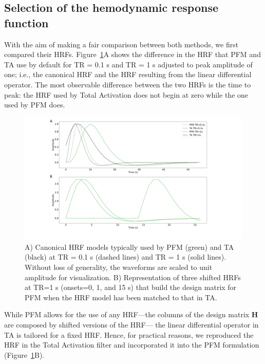 \subsection{Selection of the hemodynamic response function}

With the aim of making a fair comparison between both methods, we first compared their HRFs. Figure~\ref{fig:hrf_diff}A shows the difference in the HRF that PFM and TA use by default for TR = 0.1 s and TR = 1 s adjusted to peak amplitude of one; i.e., the canonical HRF and the HRF resulting from the linear differential operator. The most observable difference between the two HRFs is the time to peak: the HRF used by Total Activation does not begin at zero while the one used by PFM does.

\begin{figure}[h]
    \includegraphics[width=\columnwidth]{figures/pfm_ta_hrf.pdf}
    \caption{A) Canonical HRF models typically used by PFM (green) and TA (black) at TR = 0.1 s (dashed lines) and TR = 1 s (solid lines). Without loss of generality, the waveforms are scaled to unit amplitude for visualization. B) Representation of three shifted HRFs at TR=1 s (onsets=0, 1, and 15 s) that build the design matrix for PFM when the HRF model has been matched to that in TA.}
\label{fig:hrf_diff}
\end{figure}

While PFM allows for the use of any HRF---the columns of the design matrix \(\mathbf{H}\) are composed by shifted versions of the HRF--- the linear differential operator in TA is tailored for a fixed HRF. Hence, for practical reasons, we reproduced the HRF in the Total Activation filter and incorporated it into the PFM formulation (Figure~\ref{fig:hrf_diff}B).